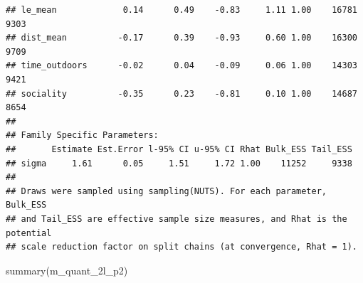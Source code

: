 \documentclass[
]{article}
\newenvironment{Shaded}{\begin{snugshade}}{\end{snugshade}}
\newcommand{\FunctionTok}[1]{\textcolor[rgb]{0.00,0.00,0.00}{#1}}
\newcommand{\NormalTok}[1]{#1}
\begin{document}
\begin{verbatim}
## le_mean             0.14      0.49    -0.83     1.11 1.00    16781     9303
## dist_mean          -0.17      0.39    -0.93     0.60 1.00    16300     9709
## time_outdoors      -0.02      0.04    -0.09     0.06 1.00    14303     9421
## sociality          -0.35      0.23    -0.81     0.10 1.00    14687     8654
## 
## Family Specific Parameters: 
##       Estimate Est.Error l-95% CI u-95% CI Rhat Bulk_ESS Tail_ESS
## sigma     1.61      0.05     1.51     1.72 1.00    11252     9338
## 
## Draws were sampled using sampling(NUTS). For each parameter, Bulk_ESS
## and Tail_ESS are effective sample size measures, and Rhat is the potential
## scale reduction factor on split chains (at convergence, Rhat = 1).
\end{verbatim}

\begin{Shaded}
\begin{Highlighting}[]
\FunctionTok{summary}\NormalTok{(m\_quant\_2l\_p2)}
\end{Highlighting}
\end{Shaded}
\end{document}
